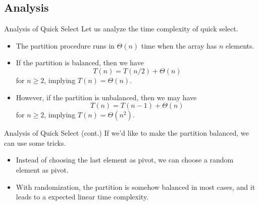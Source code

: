 \documentclass{beamer}
\begin{document}
\subsection{Analysis}
\begin{frame}{Analysis of Quick Select}
  Let us analyze the time complexity of quick select. \pause
  \begin{itemize}
    \item The partition procedure runs in $\Theta(n)$ time when the array has
    $n$ elements. \pause
    \item If the partition is balanced, then we have
    \begin{equation*}
      T(n) = T(n/2) + \Theta(n)
    \end{equation*}
    for $n \geq 2$, implying $T(n) = \Theta(n)$. \pause
    \item However, if the partition is unbalanced, then we may have
    \begin{equation*}
      T(n) = T(n - 1) + \Theta(n)
    \end{equation*}
    for $n \geq 2$, implying $T(n) = \Theta(n^2)$.
  \end{itemize}
\end{frame}

\begin{frame}{Analysis of Quick Select (cont.)}
  If we'd like to make the partition balanced, we can use some tricks. \pause
  \begin{itemize}
    \item Instead of choosing the last element as pivot, we can choose a random
    element as pivot. \pause
    \item With randomization, the partition is somehow balanced in most cases,
    and it leads to a expected linear time complexity.
  \end{itemize}
\end{frame}
\end{document}
